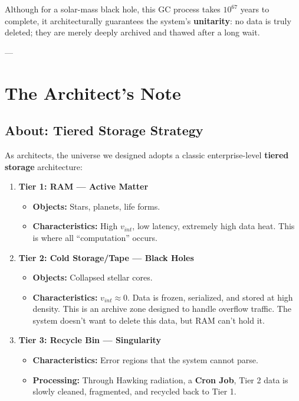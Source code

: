 \documentclass[11pt,a4paper,twoside]{book}
\begin{document}
Although for a solar-mass black hole, this GC process takes \textbf{$10^{67}$} years to complete, it architecturally guarantees the system's \textbf{unitarity}: no data is truly deleted; they are merely deeply archived and thawed after a long wait.

---

\section{The Architect's Note}

\subsection{About: Tiered Storage Strategy}

As architects, the universe we designed adopts a classic enterprise-level \textbf{tiered storage} architecture:

\begin{enumerate}
\item \textbf{Tier 1: RAM --- Active Matter}

    \begin{itemize}
    \item \textbf{Objects:} Stars, planets, life forms.

    \item \textbf{Characteristics:} High \textbf{$v_{int}$}, low latency, extremely high data heat. This is where all ``computation'' occurs.
    \end{itemize}

\item \textbf{Tier 2: Cold Storage/Tape --- Black Holes}

    \begin{itemize}
    \item \textbf{Objects:} Collapsed stellar cores.

    \item \textbf{Characteristics:} \textbf{$v_{int} \approx 0$}. Data is frozen, serialized, and stored at high density. This is an archive zone designed to handle overflow traffic. The system doesn't want to delete this data, but RAM can't hold it.
    \end{itemize}

\item \textbf{Tier 3: Recycle Bin --- Singularity}

    \begin{itemize}
    \item \textbf{Characteristics:} Error regions that the system cannot parse.

    \item \textbf{Processing:} Through Hawking radiation, a \textbf{Cron Job}, Tier 2 data is slowly cleaned, fragmented, and recycled back to Tier 1.
    \end{itemize}
\end{enumerate}
\end{document}
